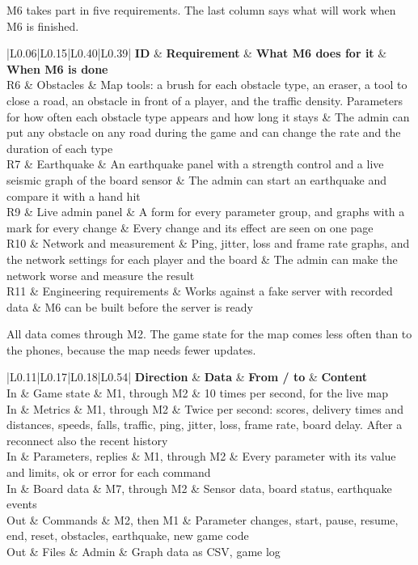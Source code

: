 \documentclass[
  english,
  10pt,
  a4paper,
]{article}
\newcommand{\ckkeep}[1]{\par\noindent\begin{minipage}{\linewidth}\setlength{\parskip}{4pt}#1\end{minipage}\par\smallskip}
\begin{document}
\ckkeep{%
M6 takes part in five requirements. The last column says what will work when M6 is finished.

\begin{tabular}{|L{0.06}|L{0.15}|L{0.40}|L{0.39}|}
\hline \textbf{ID} & \textbf{Requirement} & \textbf{What M6 does for it} & \textbf{When M6 is done} \\ \hline 
R6 & Obstacles & Map tools: a brush for each obstacle type, an eraser, a tool to close a road, an obstacle in front of a player, and the traffic density. Parameters for how often each obstacle type appears and how long it stays & The admin can put any obstacle on any road during the game and can change the rate and the duration of each type \\ \hline
R7 & Earthquake & An earthquake panel with a strength control and a live seismic graph of the board sensor & The admin can start an earthquake and compare it with a hand hit \\ \hline
R9 & Live admin panel & A form for every parameter group, and graphs with a mark for every change & Every change and its effect are seen on one page \\ \hline
R10 & Network and measurement & Ping, jitter, loss and frame rate graphs, and the network settings for each player and the board & The admin can make the network worse and measure the result \\ \hline
R11 & Engineering requirements & Works against a fake server with recorded data & M6 can be built before the server is ready \\ \hline
\end{tabular}}


\ckkeep{%
All data comes through M2. The game state for the map comes less often than to the phones, because
the map needs fewer updates.

\begin{tabular}{|L{0.11}|L{0.17}|L{0.18}|L{0.54}|}
\hline \textbf{Direction} & \textbf{Data} & \textbf{From / to} & \textbf{Content} \\ \hline 
In & Game state & M1, through M2 & 10 times per second, for the live map \\ \hline
In & Metrics & M1, through M2 & Twice per second: scores, delivery times and distances, speeds, falls, traffic, ping, jitter, loss, frame rate, board delay. After a reconnect also the recent history \\ \hline
In & Parameters, replies & M1, through M2 & Every parameter with its value and limits, ok or error for each command \\ \hline
In & Board data & M7, through M2 & Sensor data, board status, earthquake events \\ \hline
Out & Commands & M2, then M1 & Parameter changes, start, pause, resume, end, reset, obstacles, earthquake, new game code \\ \hline
Out & Files & Admin & Graph data as CSV, game log \\ \hline
\end{tabular}}
\end{document}
